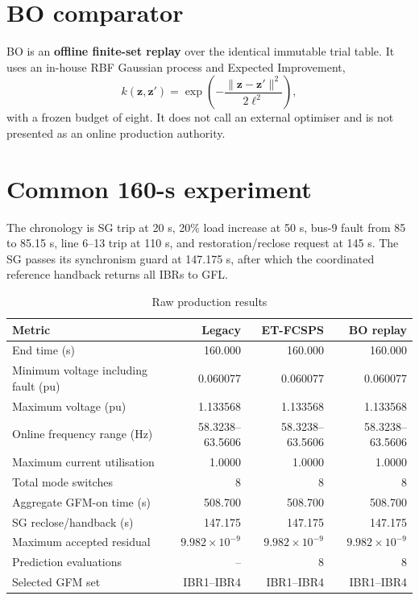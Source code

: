 \documentclass[12pt,a4paper]{article}
\newcommand{\vect}[1]{\boldsymbol{#1}}
\begin{document}
\section{BO comparator}
BO is an \textbf{offline finite-set replay} over the identical immutable trial table. It uses an in-house RBF Gaussian process and Expected Improvement,
\begin{equation}
k(\vect{z},\vect{z}')=\exp\left(-\frac{\|\vect{z}-\vect{z}'\|^2}{2\ell^2}\right),
\end{equation}
with a frozen budget of eight. It does not call an external optimiser and is not presented as an online production authority.

\section{Common 160-s experiment}
The chronology is SG trip at 20 s, 20\% load increase at 50 s, bus-9 fault from 85 to 85.15 s, line 6--13 trip at 110 s, and restoration/reclose request at 145 s. The SG passes its synchronism guard at 147.175 s, after which the coordinated reference handback returns all IBRs to GFL.

\begin{table}[H]\centering\caption{Raw production results}\small
\begin{tabular}{lrrr}\toprule
Metric & Legacy & ET-FCSPS & BO replay\\\midrule
End time (s) & 160.000 & 160.000 & 160.000\\
Minimum voltage including fault (pu) & 0.060077 & 0.060077 & 0.060077\\
Maximum voltage (pu) & 1.133568 & 1.133568 & 1.133568\\
Online frequency range (Hz) & 58.3238--63.5606 & 58.3238--63.5606 & 58.3238--63.5606\\
Maximum current utilisation & 1.0000 & 1.0000 & 1.0000\\
Total mode switches & 8 & 8 & 8\\
Aggregate GFM-on time (s) & 508.700 & 508.700 & 508.700\\
SG reclose/handback (s) & 147.175 & 147.175 & 147.175\\
Maximum accepted residual & $9.982\times10^{-9}$ & $9.982\times10^{-9}$ & $9.982\times10^{-9}$\\
Prediction evaluations & -- & 8 & 8\\
Selected GFM set & IBR1--IBR4 & IBR1--IBR4 & IBR1--IBR4\\
\bottomrule\end{tabular}\end{table}
\end{document}
